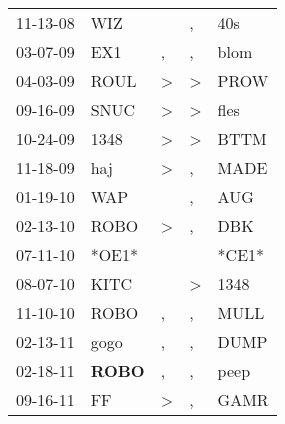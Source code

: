 \begin{supertabular}{p{0.07\textwidth}p{0.06\textwidth}p{0.02\textwidth}p{0.02\textwidth}p{0.06\textwidth}}
          11-13-08\textsuperscript{} &            WIZ\textsuperscript{} &                  &                , &            40s\textsuperscript{} \\
          03-07-09\textsuperscript{} &            EX1\textsuperscript{} &                , &                , &           blom\textsuperscript{} \\
          04-03-09\textsuperscript{} &           ROUL\textsuperscript{} &     \textgreater &     \textgreater &           PROW\textsuperscript{} \\
          09-16-09\textsuperscript{} &           SNUC\textsuperscript{} &     \textgreater &     \textgreater &           fles\textsuperscript{} \\
          10-24-09\textsuperscript{} &           1348\textsuperscript{} &     \textgreater &     \textgreater &           BTTM\textsuperscript{} \\
          11-18-09\textsuperscript{} &            haj\textsuperscript{} &     \textgreater &                , &           MADE\textsuperscript{} \\
          01-19-10\textsuperscript{} &            WAP\textsuperscript{} &                  &                , &            AUG\textsuperscript{} \\
          02-13-10\textsuperscript{} &           ROBO\textsuperscript{} &     \textgreater &                , &            DBK\textsuperscript{} \\
          07-11-10\textsuperscript{} &                            *OE1* &                  &                  &                            *CE1* \\
          08-07-10\textsuperscript{} &           KITC\textsuperscript{} &                  &     \textgreater &           1348\textsuperscript{} \\
          11-10-10\textsuperscript{} &           ROBO\textsuperscript{} &                , &                , &           MULL\textsuperscript{} \\
          02-13-11\textsuperscript{} &           gogo\textsuperscript{} &                , &                , &           DUMP\textsuperscript{} \\
          02-18-11\textsuperscript{} &  \textbf{ROBO\textsuperscript{}} &                , &                , &           peep\textsuperscript{} \\
          09-16-11\textsuperscript{} &             FF\textsuperscript{} &     \textgreater &                , &           GAMR\textsuperscript{} \\

\end{supertabular}
